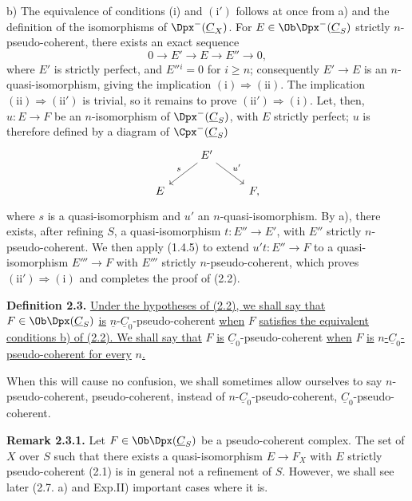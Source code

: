b) The equivalence of conditions (i) and \((\mathrm{i}')\) follows at once from a) and the definition of the isomorphisms of \(\Dpx^-(\underline{C}_X)\). For \(E\in\Ob\Dpx^-(\underline{C}_S)\) strictly \(n\)-pseudo-coherent, there exists an exact sequence
\[
  0\longrightarrow E'\longrightarrow E\longrightarrow E''\longrightarrow 0,
\]
where \(E'\) is strictly perfect, and \(E''{}^i=0\) for \(i\geq n\); consequently \(E'\to E\) is an \(n\)-quasi-isomorphism, giving the implication \((\mathrm{i})\Rightarrow(\mathrm{ii})\). The implication \((\mathrm{ii})\Rightarrow(\mathrm{ii}')\) is trivial, so it remains to prove \((\mathrm{ii}')\Rightarrow(\mathrm{i})\). Let, then, \(u:E\longrightarrow F\) be an \(n\)-isomorphism of \(\Dpx^-(\underline{C}_S)\), with \(E\) strictly perfect; \(u\) is therefore defined by a diagram of \(\Cpx^-(\underline{C}_S)\)
\[
\begin{tikzcd}
& E' \arrow[dl,"s"'] \arrow[dr,"u'"]\\
E && F ,
\end{tikzcd}
\]
where \(s\) is a quasi-isomorphism and \(u'\) an \(n\)-quasi-isomorphism. By a), there exists, after refining \(S\), a quasi-isomorphism \(t:E''\longrightarrow E'\), with \(E''\) strictly \(n\)-pseudo-coherent. We then apply (1.4.5) to extend \(u't:E''\to F\) to a quasi-isomorphism \(E'''\longrightarrow F\) with \(E'''\) strictly \(n\)-pseudo-coherent, which proves \((\mathrm{ii}')\Rightarrow(\mathrm{i})\) and completes the proof of (2.2).

%
\textbf{Definition 2.3.} \uline{Under the hypotheses of (2.2), we shall say that} \(F\in\Ob\Dpx(\underline{C}_S)\) \uline{is} \(\underline{n}\)-\(\underline{C}_0\)-pseudo-coherent \uline{when} \(F\) \uline{satisfies the equivalent conditions b) of (2.2). We shall say that} \(F\) \uline{is} \(\underline{C}_0\)-pseudo-coherent \uline{when} \(F\) \uline{is} \(n\)\uline{-}\(\underline{C}_0\)\uline{-pseudo-coherent for every} \(n\)\uline{.}

When this will cause no confusion, we shall sometimes allow ourselves to say \(n\)-pseudo-coherent, pseudo-coherent, instead of \(n\)-\(\underline{C}_0\)-pseudo-coherent, \(\underline{C}_0\)-pseudo-coherent.

\textbf{Remark 2.3.1.} Let \(F\in\Ob\Dpx(\underline{C}_S)\) be a pseudo-coherent complex. The set of \(X\) over \(S\) such that there exists a quasi-isomorphism \(E\longrightarrow F_X\) with \(E\) strictly pseudo-coherent (2.1) is in general not a refinement of \(S\). However, we shall see later (2.7. a) and Exp.II) important cases where it is.


